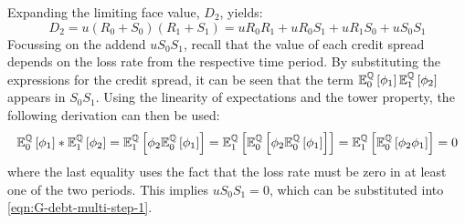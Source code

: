 \documentclass[main.tex]{subfiles}
\begin{document}
        Expanding the limiting face value, $D_{2}$, yields:
        \begin{equation*}
            D_2 = u(R_0 + S_0)(R_1 + S_1) = u R_0 R_1 + u R_0 S_1 + u R_1 S_0 + u S_0 S_1
        \end{equation*}
        Focussing on the addend $u S_0 S_1$, recall that the value of each credit spread depends on the loss rate from the respective time period.
        By substituting the expressions for the credit spread, it can be seen that the term
        $\mathbb{E}_{0}^{\mathbb{Q}}\left[\phi_1\right]\mathbb{E}_{1}^{\mathbb{Q}}\left[\phi_2\right]$
        appears in $S_0 S_1$.
        Using the linearity of expectations and the tower property, the following derivation can then be used:
        \begin{equation*}
            \mathbb{E}_{0}^{\mathbb{Q}}\left[\phi_1\right]
            * \mathbb{E}_{1}^{\mathbb{Q}}\left[\phi_2\right]
            = \mathbb{E}_{1}^{\mathbb{Q}}\left[
                \phi_2 \mathbb{E}_{0}^{\mathbb{Q}}\left[\phi_1\right]
            \right] 
            = \mathbb{E}_{1}^{\mathbb{Q}}\left[
                \mathbb{E}_{0}^{\mathbb{Q}}\left[
                    \phi_2
                    \mathbb{E}_{0}^{\mathbb{Q}}\left[
                        \phi_1
                    \right]
                \right]
            \right]
            = \mathbb{E}_{1}^{\mathbb{Q}}\left[
                \mathbb{E}_{0}^{\mathbb{Q}}\left[
                    \phi_2 \phi_1
                \right]
            \right]
            = 0
        \end{equation*}
        where the last equality uses the fact that the loss rate must be zero in at least one of the two periods.
        This implies $u S_0 S_1 = 0$, which can be substituted into \cref{eqn:G-debt-multi-step-1}.
        
\end{document}
